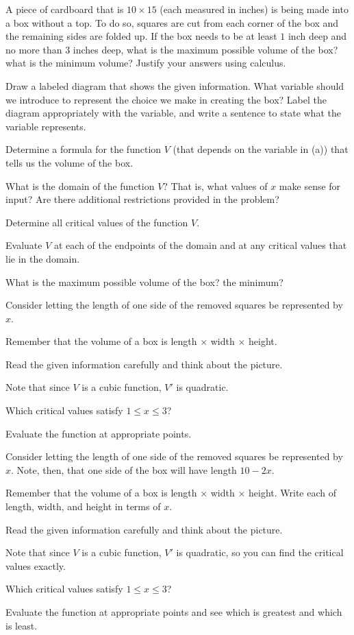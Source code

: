 \begin{activity} \label{A:3.3.3}  A piece of cardboard that is $10 \times 15$ (each measured in inches) is being made into a box without a top.  To do so, squares are cut from each corner of the box and the remaining sides are folded up.  If the box needs to be at least $1$ inch deep and no more than $3$ inches deep, what is the maximum possible volume of the box?  what is the minimum volume?  Justify your answers using calculus.
\ba
	\item Draw a labeled diagram that shows the given information.  What variable should we introduce to represent the choice we make in creating the box?  Label the diagram appropriately with the variable, and write a sentence to state what the variable represents.
	\item Determine a formula for the function $V$ (that depends on the variable in (a)) that tells us the volume of the box.
	\item What is the domain of the function $V$?  That is, what values of $x$ make sense for input?  Are there additional restrictions provided in the problem?
	\item Determine all critical values of the function $V$.
	\item Evaluate $V$ at each of the endpoints of the domain and at any critical values that lie in the domain.
	\item What is the maximum possible volume of the box?  the minimum?
\ea
\end{activity}
\begin{smallhint}
\ba
	\item Consider letting the length of one side of the removed squares be represented by $x$.
	\item Remember that the volume of a box is length $\times$ width $\times$ height.
	\item Read the given information carefully and think about the picture.
	\item Note that since $V$ is a cubic function, $V'$ is quadratic.
	\item Which critical values satisfy $1 \le x \le 3$?
	\item Evaluate the function at appropriate points.
\ea
\end{smallhint}
\begin{bighint}
\ba
	\item Consider letting the length of one side of the removed squares be represented by $x$.  Note, then, that one side of the box will have length $10 - 2x$.
	\item Remember that the volume of a box is length $\times$ width $\times$ height.  Write each of length, width, and height in terms of $x$.
	\item Read the given information carefully and think about the picture.
	\item Note that since $V$ is a cubic function, $V'$ is quadratic, so you can find the critical values exactly.
	\item Which critical values satisfy $1 \le x \le 3$?
	\item Evaluate the function at appropriate points and see which is greatest and which is least.
\ea
\end{bighint}

